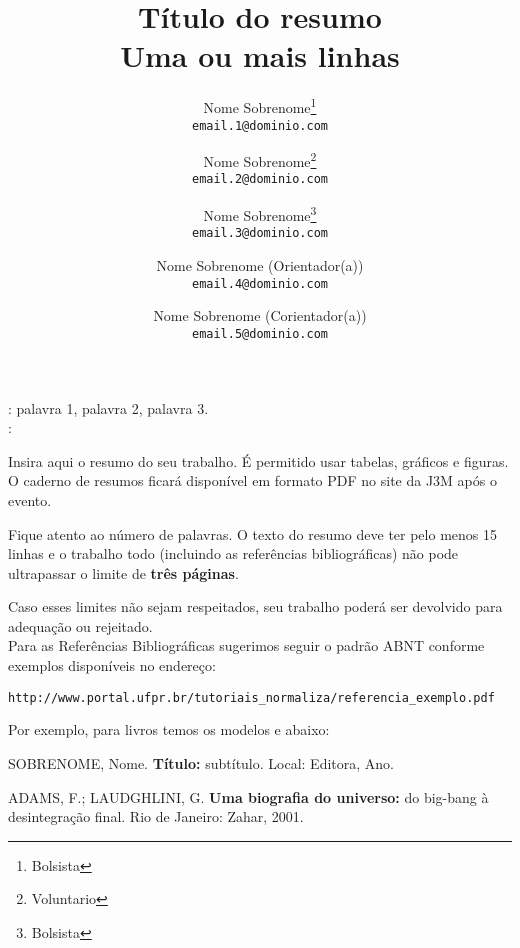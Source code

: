 \documentclass[12pt,a4paper]{article}
\title{T\'itulo do resumo \\ Uma ou mais linhas}
\author[1]{
    Nome Sobrenome\thanks{Bolsista }\\ \texttt{email.1@dominio.com}
}
\author[2]{
    Nome Sobrenome\thanks{Voluntario} \\
    \texttt{email.2@dominio.com}
}
\author[2]{
    Nome Sobrenome\thanks{Bolsista }\\
    \texttt{email.3@dominio.com}
}
\author[3]{
    Nome Sobrenome (Orientador(a))\\
    \texttt{email.4@dominio.com}
}
\author[3]{
    Nome Sobrenome (Corientador(a))\\
    \texttt{email.5@dominio.com}
}
\affil[1]{Instituição 1}
\affil[2]{Instituição 2}
\affil[3]{Instituição 3}
\date{}
\begin{document}
\renewcommand{\refname}{Referências}
\sectionfont{\fontsize{12}{12}\selectfont}
\maketitle

: palavra 1, palavra 2, palavra 3. \\[2mm]


:

Insira aqui o resumo do seu trabalho. É permitido usar tabelas, gráficos e figuras. O caderno de resumos ficará disponível em formato PDF no site da J3M após o evento.

Fique atento ao número de palavras. O texto do resumo deve ter pelo menos 15 linhas e o trabalho todo (incluindo as referências bibliográficas) não pode ultrapassar o limite de \textbf{três páginas}.

Caso esses limites não sejam respeitados, seu trabalho poderá ser devolvido para adequação ou rejeitado. \\[5mm]


Para as Referências Bibliográficas sugerimos seguir o padrão ABNT conforme exemplos disponíveis no endereço:

\verb;http://www.portal.ufpr.br/tutoriais_normaliza/referencia_exemplo.pdf;

Por exemplo, para livros temos os modelos \cite{este livro} e \cite{adams} abaixo:

\begin{thebibliography}{99}
 SOBRENOME, Nome. \textbf{Título:} subtítulo. Local: Editora, Ano.

 ADAMS, F.; LAUDGHLINI, G. \textbf{Uma biografia do universo:} do big-bang à desintegração final. Rio de Janeiro: Zahar, 2001.
\end{thebibliography}
\end{document}
